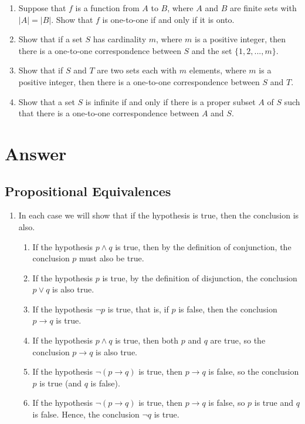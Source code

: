 \documentclass{sig-alternate-05-2015}
\begin{document}
\begin{enumerate}
\item Suppose that $f$ is a function from $A$ to $B$, where $A$ and $B$
are finite sets with $|A| = |B|$. Show that $f$ is one-to-one
if and only if it is onto.

\item Show that if a set $S$ has cardinality $m$, where $m$ is a
positive integer, then there is a one-to-one correspondence
between $S$ and the set $\{1, 2, . . . , m\}$.

\item Show that if $S$ and $T$ are two sets each with $m$ elements,
where $m$ is a positive integer, then there is a
one-to-one correspondence between $S$ and $T$.

\item Show that a set $S$ is infinite if and only if there is a proper
subset $A$ of $S$ such that there is a one-to-one correspondence
between $A$ and $S$.
\end{enumerate}



 
\newpage
\appendix
\section{Answer}
\subsection{Propositional Equivalences}
\begin{enumerate}
\item In each case we will show that if the hypothesis is true,
then the conclusion is also.
\begin{enumerate}
	\item If the hypothesis $p \wedge q$ is true,
	then by the definition of conjunction, the conclusion $p$ must
	also be true. 
	\item If the hypothesis $p$ is true, by the definition
	of disjunction, the conclusion $p \vee q$ is also true. 
	\item If the
	hypothesis $\neg p$ is true, that is, if $p$ is false, then the conclusion
	$p \rightarrow q$ is true. 
	\item If the hypothesis $p \wedge q$ is true, then both
	$p$ and $q$ are true, so the conclusion $p \rightarrow q$ is also true. 
	\item If
	the hypothesis $\neg (p \rightarrow q)$ is true, then $p \rightarrow q$ is false, so
	the conclusion $p$ is true (and $q$ is false). 
	\item If the hypothesis
	$\neg(p \rightarrow q)$ is true, then $p \rightarrow q$ is false, so $p$ is true and $q$ is
	false. Hence, the conclusion $\neg q$ is true.
\end{enumerate}
\end{enumerate}
\end{document}
